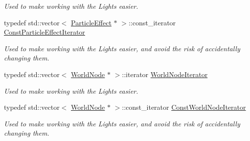\begin{DoxyCompactItemize}
\begin{DoxyCompactList}\small\item\em Used to make working with the Lights easier. \item\end{DoxyCompactList}\item 
\hypertarget{classphys_1_1SceneManager_a0026f62b121b0d7010a67a79fdc9000c}{
typedef std::vector$<$ \hyperlink{classphys_1_1ParticleEffect}{ParticleEffect} $\ast$ $>$::const\_\-iterator \hyperlink{classphys_1_1SceneManager_a0026f62b121b0d7010a67a79fdc9000c}{ConstParticleEffectIterator}}
\label{classphys_1_1SceneManager_a0026f62b121b0d7010a67a79fdc9000c}

\begin{DoxyCompactList}\small\item\em Used to make working with the Lights easier, and avoid the risk of accidentally changing them. \item\end{DoxyCompactList}\item 
\hypertarget{classphys_1_1SceneManager_a67b62f6e9116423306b82e20cb2415fd}{
typedef std::vector$<$ \hyperlink{classphys_1_1WorldNode}{WorldNode} $\ast$ $>$::iterator \hyperlink{classphys_1_1SceneManager_a67b62f6e9116423306b82e20cb2415fd}{WorldNodeIterator}}
\label{classphys_1_1SceneManager_a67b62f6e9116423306b82e20cb2415fd}

\begin{DoxyCompactList}\small\item\em Used to make working with the Lights easier. \item\end{DoxyCompactList}\item 
\hypertarget{classphys_1_1SceneManager_aa893eadb43492c0a4a9cafe2d150742c}{
typedef std::vector$<$ \hyperlink{classphys_1_1WorldNode}{WorldNode} $\ast$ $>$::const\_\-iterator \hyperlink{classphys_1_1SceneManager_aa893eadb43492c0a4a9cafe2d150742c}{ConstWorldNodeIterator}}
\label{classphys_1_1SceneManager_aa893eadb43492c0a4a9cafe2d150742c}

\begin{DoxyCompactList}\small\item\em Used to make working with the Lights easier, and avoid the risk of accidentally changing them. \item\end{DoxyCompactList}\end{DoxyCompactItemize}
